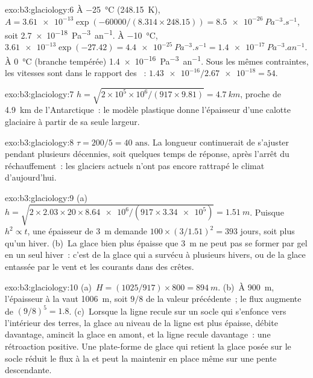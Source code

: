 \begin{solution}{exo:b3:glaciology:6}
À \qty{-25}{\celsius} (\qty{248.15}{K}), $A = \num{3.61e-13}\exp(-60000/
(8.314\times248.15)) = \qty{8.5e-26}{Pa^{-3}.s^{-1}}$, soit
\qty{2.7e-18}{Pa^{-3}.an^{-1}}. À \qty{-10}{\celsius}, $\num{3.61e-13}
\exp(-27.42) = \qty{4.4e-25}{Pa^{-3}.s^{-1}} = \qty{1.4e-17}{Pa^{-3}.an^{-1}}$.
À \qty{0}{\celsius} (branche tempérée) \qty{1.4e-16}{Pa^{-3}.an^{-1}}. Sous
les mêmes contraintes, les vitesses sont dans le rapport des ~:
$\num{1.43e-16}/\num{2.67e-18} = 54$.
\end{solution}

\begin{solution}{exo:b3:glaciology:7}
$h = \sqrt{2\times10^5\times10^6/(917\times9.81)} = \qty{4.7}{km}$, proche de
\qty{4.9}{km} de l'Antarctique~: le modèle plastique donne l'épaisseur
d'une calotte glaciaire à partir de sa seule largeur.
\end{solution}

\begin{solution}{exo:b3:glaciology:8}
$\tau = 200/5 = \num{40}\text{ ans}$. La longueur continuerait de s'ajuster pendant
plusieurs décennies, soit quelques temps de réponse, après l'arrêt du réchauffement~:
les glaciers actuels n'ont pas encore rattrapé le climat d'aujourd'hui.
\end{solution}

\begin{solution}{exo:b3:glaciology:9}
(a)~$h = \sqrt{2\times2.03\times20\times\num{8.64e6}/(917\times\num{3.34e5})}
= \qty{1.51}{m}$. Puisque $h^2 \propto t$, une épaisseur de \qty{3}{m} demande $100\times
(3/1.51)^2 = 393$ jours, soit plus qu'un hiver. (b)~La glace bien plus épaisse que
\qty{3}{m} ne peut pas se former par gel en un seul hiver~: c'est de la glace qui a
survécu à plusieurs hivers, ou de la glace entassée par le vent et les courants dans des crêtes.
\end{solution}

\begin{solution}{exo:b3:glaciology:10}
(a)~$H = (1025/917)\times800 = \qty{894}{m}$. (b)~À \qty{900}{m}, l'épaisseur
à la  vaut \qty{1006}{m}, soit $9/8$ de la valeur précédente~; le flux
augmente de $(9/8)^5 = 1.8$. (c)~Lorsque la ligne recule sur un socle qui s'enfonce
vers l'intérieur des terres, la glace au niveau de la ligne est plus épaisse, débite davantage, amincit la glace
en amont, et la ligne recule davantage~: une rétroaction positive. Une plate-forme de glace
qui retient la glace posée sur le socle réduit le flux à la  et peut
la maintenir en place même sur une pente descendante.
\end{solution}

